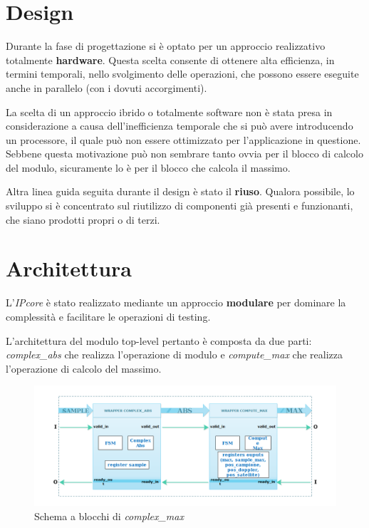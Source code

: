 \documentclass[12pt,a4paper,twoside,openany]{book}
\begin{document}
\section{Design}
Durante la fase di progettazione si è optato per un approccio realizzativo totalmente \textbf{hardware}. Questa scelta consente di ottenere alta efficienza, in termini temporali, nello svolgimento delle operazioni, che possono essere eseguite anche in parallelo (con i dovuti accorgimenti). 

La scelta di un approccio ibrido o totalmente software non è stata presa in considerazione a causa dell'inefficienza temporale che si può avere introducendo un processore, il quale può non essere ottimizzato per l'applicazione in questione. Sebbene questa motivazione può non sembrare tanto ovvia per il blocco di calcolo del modulo, sicuramente lo è per il blocco che calcola il massimo.

Altra linea guida seguita durante il design è stato il \textbf{riuso}. Qualora possibile, lo sviluppo si è concentrato sul riutilizzo di componenti già presenti e funzionanti, che siano prodotti propri o di terzi.
\section{Architettura}
L'\textit{IPcore} è stato realizzato mediante un approccio \textbf{modulare} per dominare la complessità e facilitare le operazioni di testing.

L'architettura del modulo top-level pertanto è composta da due parti: \textit{complex\_abs} che realizza l'operazione di modulo e \textit{compute\_max} che realizza l'operazione di calcolo del massimo.

\begin{figure}[hb]
\begin{center}
\includegraphics[scale=0.55, keepaspectratio]{immagini/complexmax_schemablocchi}
\caption{Schema a blocchi di \textit{complex\_max}}
\label{complexmax_top}
\end{center}
\end{figure}
\clearpage
\end{document}
